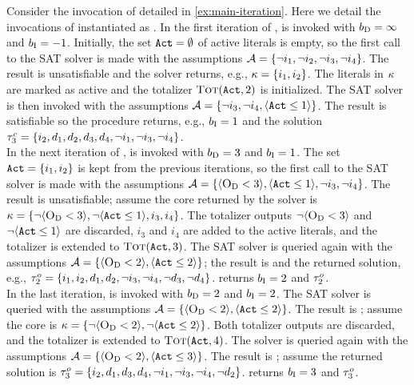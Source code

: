 \begin{example}\label{ex:msu}
  Consider the invocation of \algname{} detailed in \cref{ex:main-iteration}. 
  Here we detail the invocations of \Min{} instantiated as \msu{}. 
  In the first iteration of \algname{}, \msu{} is invoked with $b_{\text{D}} =\infty$ and $b_{\text{I}} = -1$.
  Initially, the set $\texttt{Act} = \emptyset$ of active literals is empty, so the first call to the SAT solver is made with the assumptions $\mathcal{A} =  \{ \lnot i_1, \allowbreak \lnot i_2, \allowbreak \lnot i_3, \allowbreak \lnot i_4\}$.
  The result is unsatisfiable and the solver returns, e.g., $\kappa = \{i_1, i_2\}$. 
  The literals in $\kappa$ are marked as active and the totalizer $\textsc{Tot}(\texttt{Act}, 2)$ is initialized.
  The SAT solver is then invoked with the assumptions $\mathcal{A} = \{ \lnot i_3, \lnot i_4, \langle \texttt{Act} \leq 1 \rangle\}$. 
  The result is satisfiable so the procedure returns, e.g., $b_{\text{I}} = 1$ and the solution $\tau^c_3 = \{i_2,\allowbreak d_1,\allowbreak d_2,\allowbreak d_3,\allowbreak d_4,\allowbreak \lnot i_1,\allowbreak \lnot i_3,\allowbreak \lnot i_4\}$. \\
  In the next iteration of \algname{}, \msu{} is invoked with $b_{\text{D}} = 3$ and $b_{\text{I}} = 1$.
  The set $\texttt{Act} = \{i_1, i_2\}$ is kept from the previous iterations, so the first call to the SAT solver is made with the assumptions $\mathcal{A} = \{ \langle \textsc{O}_{\text{D}} < 3 \rangle, \allowbreak \langle \texttt{Act} \leq 1 \rangle, \allowbreak \lnot i_3, \allowbreak \lnot i_4 \}$.
  The result is unsatisfiable;
  assume the core returned by the solver is $\kappa = \{ \lnot \langle \textsc{O}_{\text{D}} < 3 \rangle, \allowbreak \lnot \langle \texttt{Act} \leq 1 \rangle, \allowbreak i_3, \allowbreak i_4 \}$.
  The totalizer outputs $\lnot \langle \textsc{O}_{\text{D}} < 3 \rangle$ and $\lnot \langle \texttt{Act} \leq 1 \rangle$ are discarded, $i_3$ and $i_4$ are added to the active literals, and the totalizer is extended to $\textsc{Tot}(\texttt{Act}, 3)$.
  The SAT solver is queried again with the assumptions $\mathcal{A} = \{\langle \textsc{O}_{\text{D}} < 2 \rangle, \langle \texttt{Act} \leq 2 \rangle\}$;
  the result is \sat{} and the returned solution, e.g., $\tau^o_2 = \{i_1,\allowbreak i_2,\allowbreak d_1,\allowbreak d_2,\allowbreak \lnot i_3,\allowbreak \lnot i_4,\allowbreak \lnot d_3,\allowbreak \lnot d_4\}$.
  \msu{} returns $b_{\text{I}} = 2$ and $\tau^o_2$. \\
  In the last iteration, \msu{} is invoked with $b_{\text{D}} = 2$ and $b_{\text{I}} = 2$.
  The SAT solver is queried with the assumptions $\mathcal{A} = \{\langle \textsc{O}_{\text{D}} < 2 \rangle, \langle \texttt{Act} \leq 2 \rangle\}$.
  The result is \unsat{};
  assume the core is $\kappa = \{ \lnot \langle \textsc{O}_{\text{D}} < 2 \rangle, \lnot \langle \texttt{Act} \leq 2 \rangle \}$.
  Both totalizer outputs are discarded, and the totalizer is extended to $\textsc{Tot}(\texttt{Act}, 4)$.
  The solver is queried again with the assumptions $\mathcal{A} = \{\langle \textsc{O}_{\text{D}} < 2 \rangle, \langle \texttt{Act} \leq 3 \rangle\}$.
  The result is \sat{};
  assume the returned solution is $\tau^o_3 = \{i_2,\allowbreak d_1,\allowbreak d_3,\allowbreak d_4,\allowbreak \lnot i_1,\allowbreak \lnot i_3,\allowbreak \lnot i_4,\allowbreak \lnot d_2\}$.
  \msu{} returns $b_{\text{I}} = 3$ and $\tau^o_3$.
\end{example}

